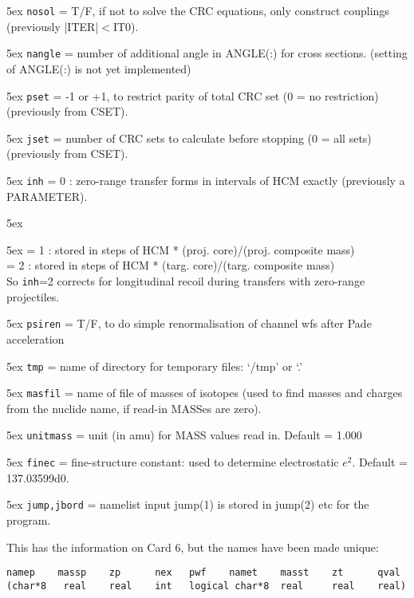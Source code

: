 \documentclass[11pt]{article}
\begin{document}
\hangindent 5ex
{\tt nosol} = T/F, if not to solve the CRC equations, only construct couplings
        (previously |ITER|$<$IT0).

\hangindent 5ex
{\tt nangle} = number of additional angle in ANGLE(:) for cross sections.
 (setting of ANGLE(:) is not yet implemented)

\hangindent 5ex
{\tt pset} = -1 or +1, to restrict parity of total CRC set (0 = no restriction)
        (previously from CSET).

\hangindent 5ex
{\tt jset} = number of CRC sets to calculate before stopping (0 = all sets)
        (previously from CSET).

\hangindent 5ex
{\tt inh} = 0 : zero-range transfer forms in intervals of HCM exactly
        (previously a PARAMETER).

\hangindent 5ex

\hangindent 5ex
    = 1 : stored in steps of HCM * (proj. core)/(proj. composite mass)\\
    = 2 : stored in steps of HCM * (targ. core)/(targ. composite mass)\\
    So {\tt inh}=2 corrects for longitudinal recoil during transfers
with zero-range projectiles.

\hangindent 5ex
{\tt psiren} = T/F, to do simple renormalisation of channel wfs after Pade acceleration

\hangindent 5ex
{\tt tmp} = name of directory for temporary files: `/tmp' or `.'

\hangindent 5ex
{\tt masfil} = name of file of masses of isotopes (used to find masses and charges
from the nuclide name, if read-in MASSes are zero).

\hangindent 5ex
{\tt unitmass} = unit (in amu) for MASS values read in.
Default = 1.000

\hangindent 5ex
{\tt finec} = fine-structure constant: used to determine electrostatic $e^2$.
Default = 137.03599d0.

\hangindent 5ex
{\tt jump,jbord} = namelist input jump(1) is stored in jump(2) etc for the program.



This has the information on Card 6, but the names have been made unique:
\begin{verbatim}
namep    massp    zp      nex   pwf    namet    masst    zt      qval
(char*8   real    real    int   logical char*8  real     real    real)
\end{verbatim}
\end{document}
